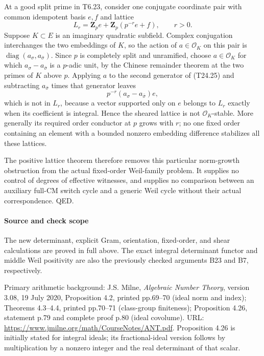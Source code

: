 At a good split prime in T6.23, consider one conjugate coordinate pair with common idempotent basis \(e,f\) and lattice \[
 L_r=\mathbf Z_p e+\mathbf Z_p(p^{-r}e+f),\qquad r>0.
 \tag{T24.25}
\] Suppose \(K\subset E\) is an imaginary quadratic subfield. Complex conjugation interchanges the two embeddings of \(K\), so the action of \(a\in\mathcal O_K\) on this pair is \(\operatorname{diag}(a_\sigma,a_{\bar\sigma})\). Since \(p\) is completely split and unramified, choose \(a\in\mathcal O_K\) for which \(a_\sigma-a_{\bar\sigma}\) is a \(p\)-adic unit, by the Chinese remainder theorem at the two primes of \(K\) above \(p\). Applying \(a\) to the second generator of (T24.25) and subtracting \(a_{\bar\sigma}\) times that generator leaves \[
 p^{-r}(a_\sigma-a_{\bar\sigma})e,
 \tag{T24.26}
\] which is not in \(L_r\), because a vector supported only on \(e\) belongs to \(L_r\) exactly when its coefficient is integral. Hence the sheared lattice is not \(\mathcal O_K\)-stable. More generally its required order conductor at \(p\) grows with \(r\); no one fixed order containing an element with a bounded nonzero embedding difference stabilizes all these lattices.

The positive lattice theorem therefore removes this particular norm-growth obstruction from the actual fixed-order Weil-family problem. It supplies no control of degrees of effective witnesses, and supplies no comparison between an auxiliary full-CM switch cycle and a generic Weil cycle without their actual correspondence. QED.

\paragraph{Source and check scope}\label{source-and-check-scope}

The new determinant, explicit Gram, orientation, fixed-order, and shear calculations are proved in full above. The exact integral determinant functor and middle Weil positivity are also the previously checked arguments B23 and B7, respectively.

Primary arithmetic background: J.S. Milne, \emph{Algebraic Number Theory}, version 3.08, 19 July 2020, Proposition 4.2, printed pp.69--70 (ideal norm and index); Theorems 4.3--4.4, printed pp.70--71 (class-group finiteness); Proposition 4.26, statement p.79 and complete proof p.80 (ideal covolume). URL: \url{https://www.jmilne.org/math/CourseNotes/ANT.pdf}. Proposition 4.26 is initially stated for integral ideals; its fractional-ideal version follows by multiplication by a nonzero integer and the real determinant of that scalar.

